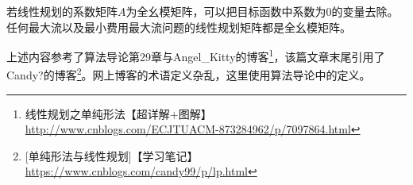 若线性规划的系数矩阵$A$为全幺模矩阵，可以把目标函数中系数为0的变量去除。
任何最大流以及最小费用最大流问题的线性规划矩阵都是全幺模矩阵。

上述内容参考了算法导论\cite{ITA3}第29章与Angel\_Kitty的博客\footnote{
    线性规划之单纯形法【超详解+图解】
    \url{http://www.cnblogs.com/ECJTUACM-873284962/p/7097864.html}
}，该篇文章末尾引用了Candy?的博客\footnote{
    [单纯形法与线性规划]【学习笔记】
    \url{https://www.cnblogs.com/candy99/p/lp.html}
}。网上博客的术语定义杂乱，这里使用算法导论中的定义。
